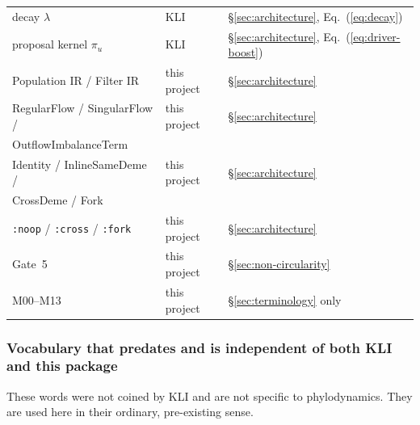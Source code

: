 \documentclass[11pt,leqno]{article}
\newcommand{\code}[1]{\texttt{#1}}
\theoremstyle{plain}
\theoremstyle{definition}
\begin{document}
\begin{center}
\begin{tabular}{lll}
decay $\lambda$                  & KLI  & \S\ref{sec:architecture}, Eq.~(\ref{eq:decay}) \\
proposal kernel $\pi_u$          & KLI  & \S\ref{sec:architecture}, Eq.~(\ref{eq:driver-boost}) \\
Population IR / Filter IR        & this project & \S\ref{sec:architecture} \\
RegularFlow / SingularFlow /     & this project & \S\ref{sec:architecture} \\
\quad OutflowImbalanceTerm       &              &                            \\
Identity / InlineSameDeme /      & this project & \S\ref{sec:architecture} \\
\quad CrossDeme / Fork           &              &                            \\
\code{:noop} / \code{:cross} / \code{:fork}
                                 & this project & \S\ref{sec:architecture} \\
Gate~5                           & this project & \S\ref{sec:non-circularity} \\
M00--M13                        & this project & \S\ref{sec:terminology} only \\
\bottomrule
\end{tabular}
\end{center}

\subsubsection{Vocabulary that predates and is independent of both KLI and
this package}

These words were not coined by KLI and are not specific to phylodynamics.
They are used here in their ordinary, pre-existing sense.
\end{document}
